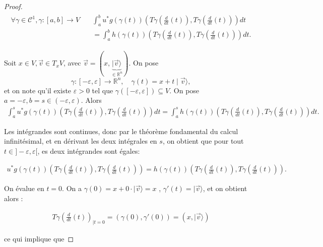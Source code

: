 \documentclass[french]{article}
\theoremstyle{definition}
\newcommand{\R}{\mathbb{R}}
\newcommand{\biggg}{>}
\newcommand{\bg}{\biggg}
\begin{document}
\begin{proof}
  \begin{gather*}
  \begin{aligned}
 \forall \gamma \in \mathcal{C}^1, \gamma : [a,b] \longrightarrow V\quad  &  \int_{a}^{b} u ^{*}g(\gamma(t))\left(T \gamma \left(\frac{d}{dt}(t)\right), T \gamma \left(\frac{d}{dt}(t)\right)\right) dt \\ &
    = \int_{a}^{b} h (\gamma(t)) \left(T \gamma \left(\frac{d}{dt}(t)\right), T \gamma \left(\frac{d}{dt}(t)\right)\right) dt.
 \end{aligned}
  \end{gather*}

  Soit \(x \in V, \vec{v} \in T_x V\), avec \(\vec{v}=(x, \underbrace{\mid \vec{v} \rangle}_{\in \mathbb{R}^n})\). On pose
  \[  \gamma : [-\varepsilon, \varepsilon] \longrightarrow \R^n, \quad \gamma(t) = x + t \mid \vec{v} \rangle,\] et on note qu'il existe \(\varepsilon \bg 0\) tel que \(\gamma([-\varepsilon, \varepsilon]) \subseteq V\).
  On pose \(a = -\varepsilon,b=s \in (-\varepsilon,\varepsilon)\).  Alors
  \begin{gather*}
    \int_{a}^{s} u ^{*}g(\gamma(t)) \left(T \gamma \left(\frac{d}{dt}(t)\right), T \gamma \left(\frac{d}{dt}(t)\right)\right) dt = \int_{a}^{s} h(\gamma(t)) \left(T \gamma \left(\frac{d}{dt}(t)\right), T \gamma \left(\frac{d}{dt}(t)\right)\right) dt.
  \end{gather*}

  Les int\'egrandes sont continues, donc par le th\'eor\`eme fondamental du  calcul infinit\'esimal, et en d\'erivant les deux int\'egrales en $s$, on obtient que pour tout $t\in ]-\varepsilon, \varepsilon[$, es deux int\'egrandes sont \'egales:

  \begin{gather*}
 u ^{*}g(\gamma(t)) \left(T \gamma \left(\frac{d}{dt}(t)\right), T \gamma \left(\frac{d}{dt}(t)\right) \right )= h(\gamma(t)) \left(T \gamma \left(\frac{d}{dt}(t)\right), T \gamma \left(\frac{d}{dt}(t)\right)\right).
  \end{gather*}


  On évalue en \(t = 0\). On a \(\gamma(0) = x + 0 \cdot \mid \vec{v} \rangle = x\) , \(\gamma'(t) = \mid \vec{v}\rangle \), et on obtient alors :

  \begin{gather*}
    T \gamma \left(\frac{d}{dt}(t)\right)_{\mid t=0} = (\gamma(0), \gamma'(0)) = (x,  \mid \vec{v} \rangle)
  \end{gather*}

  ce qui implique que


\end{proof}
\end{document}
